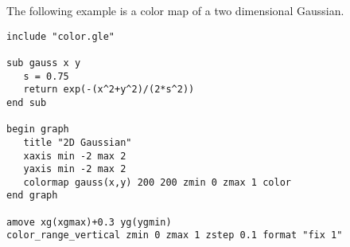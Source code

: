 The following example is a color map of a two dimensional Gaussian.

\preglegraph{}
\begin{minipage}[c]{8cm}
\begin{Verbatim}
include "color.gle"

sub gauss x y
   s = 0.75
   return exp(-(x^2+y^2)/(2*s^2))
end sub

begin graph
   title "2D Gaussian"
   xaxis min -2 max 2
   yaxis min -2 max 2
   colormap gauss(x,y) 200 200 zmin 0 zmax 1 color
end graph

amove xg(xgmax)+0.3 yg(ygmin)
color_range_vertical zmin 0 zmax 1 zstep 0.1 format "fix 1"
\end{Verbatim}
\end{minipage}
\hfill
\begin{minipage}[c]{7cm}
\mbox{}
\end{minipage}
\postglegraph{}
